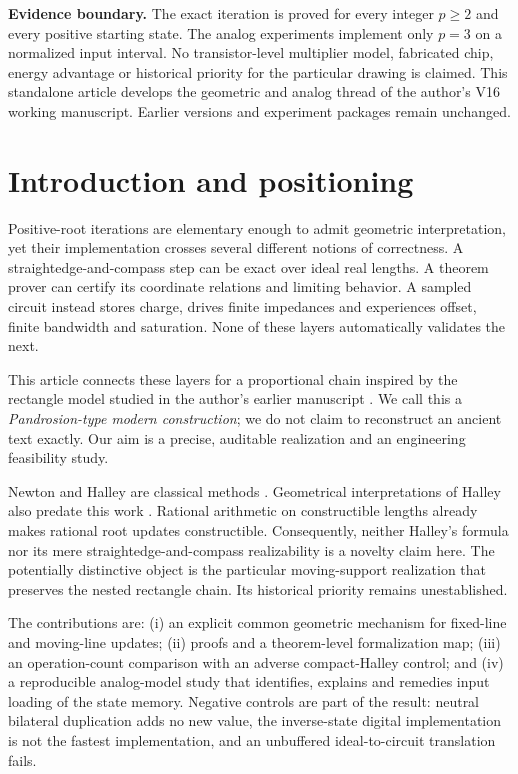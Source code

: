 \documentclass[11pt,a4paper]{article}
\theoremstyle{remark}\newtheorem{remark}[theorem]{Remark}
\numberwithin{equation}{section}
\begin{document}
\vspace{8pt}
\textbf{Evidence boundary.} The exact iteration is proved for every integer $p\ge2$ and every positive starting state. The analog experiments implement only $p=3$ on a normalized input interval. No transistor-level multiplier model, fabricated chip, energy advantage or historical priority for the particular drawing is claimed.
\vfill
{\small This standalone article develops the geometric and analog thread of the author's V16 working manuscript. Earlier versions and experiment packages remain unchanged.}
\clearpage

\section{Introduction and positioning}
Positive-root iterations are elementary enough to admit geometric interpretation, yet their implementation crosses several different notions of correctness. A straightedge-and-compass step can be exact over ideal real lengths. A theorem prover can certify its coordinate relations and limiting behavior. A sampled circuit instead stores charge, drives finite impedances and experiences offset, finite bandwidth and saturation. None of these layers automatically validates the next.

This article connects these layers for a proportional chain inspired by the rectangle model studied in the author's earlier manuscript \citep{v16}. We call this a \emph{Pandrosion-type modern construction}; we do not claim to reconstruct an ancient text exactly. Our aim is a precise, auditable realization and an engineering feasibility study.

Newton and Halley are classical methods \citep{dlmf}. Geometrical interpretations of Halley also predate this work \citep{scavo}. Rational arithmetic on constructible lengths already makes rational root updates constructible. Consequently, neither Halley's formula nor its mere straightedge-and-compass realizability is a novelty claim here. The potentially distinctive object is the particular moving-support realization that preserves the nested rectangle chain. Its historical priority remains unestablished.

The contributions are: (i) an explicit common geometric mechanism for fixed-line and moving-line updates; (ii) proofs and a theorem-level formalization map; (iii) an operation-count comparison with an adverse compact-Halley control; and (iv) a reproducible analog-model study that identifies, explains and remedies input loading of the state memory. Negative controls are part of the result: neutral bilateral duplication adds no new value, the inverse-state digital implementation is not the fastest implementation, and an unbuffered ideal-to-circuit translation fails.
\end{document}
